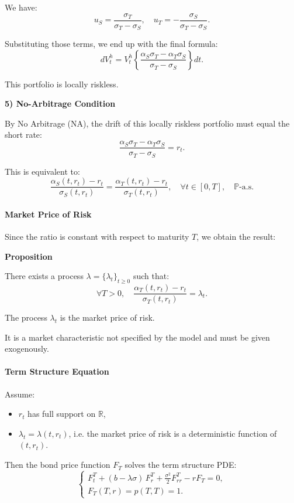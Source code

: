 \documentclass[12pt,a4paper]{article}
\theoremstyle{definition}
\begin{document}
We have:
\[
u_S = \frac{\sigma_T}{\sigma_T - \sigma_S}, \quad u_T = - \frac{\sigma_S}{\sigma_T - \sigma_S}.
\]

Substituting those terms, we end up with the final formula:
\[
dV_t^h = V_t^h\left\{\frac{\alpha_S \sigma_T - \alpha_T \sigma_S}{\sigma_T - \sigma_S}\right\} dt.
\]

This portfolio is locally riskless.

\textbf{5) No-Arbitrage Condition}

By No Arbitrage (NA), the drift of this locally riskless portfolio must equal the short rate:
\[
\frac{\alpha_S \sigma_T - \alpha_T \sigma_S}{\sigma_T - \sigma_S} = r_t.
\]

This is equivalent to:
\[
\frac{\alpha_S(t, r_t) - r_t}{\sigma_S(t, r_t)} = \frac{\alpha_T(t, r_t) - r_t}{\sigma_T(t, r_t)}, \quad \forall t \in [0, T], \quad \mathbb{P}\text{-a.s.}
\]

\paragraph{Market Price of Risk}

Since the ratio is constant with respect to maturity $T$, we obtain the result:

\textbf{Proposition}

There exists a process $\lambda = \{\lambda_t\}_{t \geq 0}$ such that:
\[
\forall T > 0, \quad \frac{\alpha_T(t, r_t) - r_t}{\sigma_T(t, r_t)} = \lambda_t.
\]

The process $\lambda_t$ is the market price of risk.

It is a market characteristic not specified by the model and must be given exogenously.

\paragraph{Term Structure Equation}

Assume:

\begin{itemize}
\item $r_t$ has full support on $\mathbb{R}$,

\item $\lambda_t = \lambda(t, r_t)$, i.e. the market price of risk is a deterministic function of $(t, r_t)$.
\end{itemize}

Then the bond price function $F_T$ solves the term structure PDE:
\[
\begin{cases}
F_t^T + (b - \lambda\sigma) \, F_r^T + \frac{\sigma^2}{2}F_{rr}^T - rF_T = 0, \\
F_T(T, r) = p(T, T) = 1.
\end{cases}
\]
\end{document}
